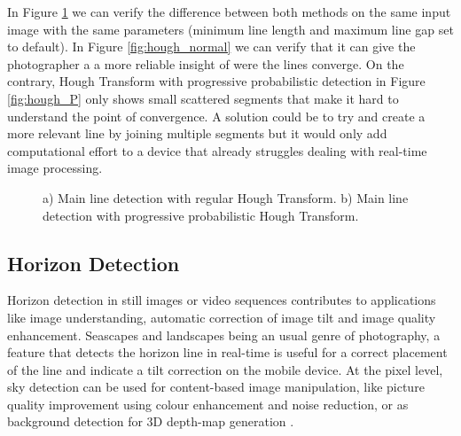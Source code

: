 In Figure \ref{fig:hough_methods} we can verify the difference between both methods on the same input image with the same parameters (minimum line length and maximum line gap set to default). In Figure \ref{fig:hough_normal} we can verify that it can give the photographer a a more reliable insight of were the lines converge. On the contrary, Hough Transform with progressive probabilistic detection in Figure \ref{fig:hough_P} only shows small scattered segments that make it hard to understand the point of convergence. A solution could be to try and create a more relevant line by joining multiple segments but it would only add computational effort to a device that already struggles dealing with real-time image processing.

\begin{figure}[htbp]
	\centering
  	\caption{a) Main line detection with regular Hough Transform. b) Main line detection with progressive probabilistic Hough Transform.}
    \label{fig:hough_methods}
\end{figure}

\subsection{Horizon Detection}
\label{sub:horizon_detection}

Horizon detection in still images or video sequences contributes to applications like image understanding, automatic correction of image tilt and image quality enhancement. Seascapes and landscapes being an usual genre of photography, a feature that detects the horizon line in real-time is useful for a correct placement of the line and indicate a tilt correction on the mobile device. At the pixel level, sky detection can be used for content-based image manipulation, like picture quality improvement using colour enhancement and noise reduction, or as background detection for 3D depth-map generation \cite{zafarifar2006blue}.

